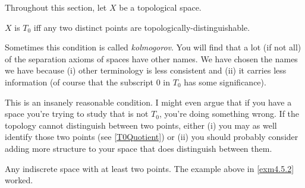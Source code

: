 Throughout this section, let $X$ be a topological space.
\begin{dfn}[$T_0$]\label{T0}
$X$ is \emph{$T_0$} iff any two distinct points are topologically-distinguishable.
\begin{rmk}
Sometimes this condition is called \emph{kolmogorov}.  You will find that a lot (if not all) of the separation axioms of spaces have other names.  We have chosen the names we have because (i) other terminology is less consistent and (ii) it carries less information (of course that the subscript $0$ in $T_0$ has some significance).
\end{rmk}
\begin{rmk}
This is an insanely reasonable condition.  I might even argue that if you have a space you're trying to study that is not $T_0$, you're doing something wrong.  If the topology cannot distinguish between two points, either (i) you may as well identify those two points (see \cref{T0Quotient}) or (ii) you should probably consider adding more structure to your space that does distinguish between them.
\end{rmk}
\end{dfn}
\begin{exm}
Any indiscrete space with at least two points.  The example above in \cref{exm4.5.2} worked.
\end{exm}
